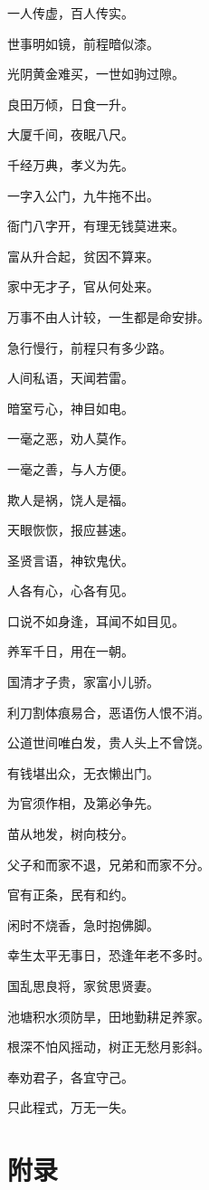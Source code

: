 \documentclass[12pt,oneside]{book}
\begin{document}
一人传虚，百人传实。

世事明如镜，前程暗似漆。

光阴黄金难买，一世如驹过隙。

良田万倾，日食一升。

大厦千间，夜眠八尺。

千经万典，孝义为先。

一字入公门，九牛拖不出。

衙门八字开，有理无钱莫进来。

富从升合起，贫因不算来。

家中无才子，官从何处来。

万事不由人计较，一生都是命安排。

急行慢行，前程只有多少路。

人间私语，天闻若雷。

暗室亏心，神目如电。

一毫之恶，劝人莫作。

一毫之善，与人方便。

欺人是祸，饶人是福。

天眼恢恢，报应甚速。

圣贤言语，神钦鬼伏。

人各有心，心各有见。

口说不如身逢，耳闻不如目见。

养军千日，用在一朝。

国清才子贵，家富小儿骄。

利刀割体痕易合，恶语伤人恨不消。

公道世间唯白发，贵人头上不曾饶。

有钱堪出众，无衣懒出门。

为官须作相，及第必争先。

苗从地发，树向枝分。

父子和而家不退，兄弟和而家不分。

官有正条，民有和约。

闲时不烧香，急时抱佛脚。

幸生太平无事日，恐逢年老不多时。

国乱思良将，家贫思贤妻。

池塘积水须防旱，田地勤耕足养家。

根深不怕风摇动，树正无愁月影斜。

奉劝君子，各宜守己。

只此程式，万无一失。  
  
\part{附录}
\end{document}
